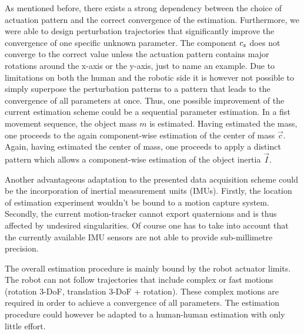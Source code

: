 As mentioned before, there exists a strong dependency between the choice of actuation pattern and the correct convergence of the estimation. Furthermore, we were able to design perturbation trajectories that significantly improve the convergence of one specific unknown parameter. The component $c_{\mathrm{z}}$ does not converge to the correct value unless the actuation pattern contains major rotations around the x-axis or the y-axis, just to name an example. Due to limitations on both the human and the robotic side it is however not possible to simply superpose the perturbation patterns to a pattern that leads to the convergence of all parameters at once. Thus, one possible improvement of the current estimation scheme could be a sequential parameter estimation. In a fist movement sequence, the object mass $m$ is estimated. Having estimated the mass, one proceeds to the again component-wise estimation of the center of mass $\vec{c}$. Again, having estimated the center of mass, one proceeds to apply a distinct pattern which allows a component-wise estimation of the object inertia $\vec{I}$.

Another advantageous adaptation to the presented data acquisition scheme could be the incorporation of inertial measurement units (IMUs). Firstly, the location of estimation experiment wouldn't be bound to a motion capture system. Secondly, the current motion-tracker cannot export quaternions and is thus affected by undesired singularities. Of course one has to take into account that the currently available IMU sensors are not able to provide sub-millimetre precision.


The overall estimation procedure is mainly bound by the robot actuator limits. The robot can not follow trajectories that include complex or fast motions (rotation 3-DoF, translation 3-DoF + rotation). These complex motions are required in order to achieve a convergence of all parameters. The estimation procedure could however be adapted to a human-human estimation with only little effort.
